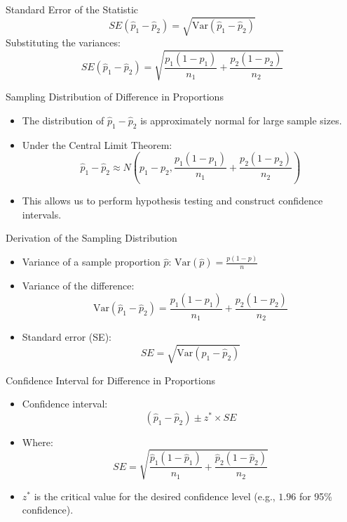 \documentclass[handout]{beamer} %
\begin{document}
\begin{frame}{Standard Error of the Statistic}
  \[
  SE(\hat{p}_1 - \hat{p}_2) = \sqrt{\text{Var}(\hat{p}_1 - \hat{p}_2)}
  \]
  Substituting the variances:
  \[
  SE(\hat{p}_1 - \hat{p}_2) = \sqrt{\frac{p_1(1 - p_1)}{n_1} + \frac{p_2(1 - p_2)}{n_2}}
  \]
\end{frame}

\begin{frame}{Sampling Distribution of Difference in Proportions}
  \begin{itemize}
    \item The distribution of $\hat{p}_1 - \hat{p}_2$ is approximately normal for large sample sizes.
    \item Under the Central Limit Theorem:
    \[
    \hat{p}_1 - \hat{p}_2 \approx N\left(p_1 - p_2, \frac{p_1(1 - p_1)}{n_1} + \frac{p_2(1 - p_2)}{n_2}\right)
    \]
    \item This allows us to perform hypothesis testing and construct confidence intervals.
  \end{itemize}
\end{frame}

\begin{frame}{Derivation of the Sampling Distribution}
  \begin{itemize}
    \item Variance of a sample proportion $\hat{p}$: $\text{Var}(\hat{p}) = \frac{p(1-p)}{n}$
    \item Variance of the difference:
    \[
    \text{Var}(\hat{p}_1 - \hat{p}_2) = \frac{p_1(1 - p_1)}{n_1} + \frac{p_2(1 - p_2)}{n_2}
    \]
    \item Standard error (SE):
    \[
    SE = \sqrt{\text{Var}(\hat{p}_1 - \hat{p}_2)}
    \]
  \end{itemize}
\end{frame}

\begin{frame}{Confidence Interval for Difference in Proportions}
  \begin{itemize}
    \item Confidence interval:
    \[
    (\hat{p}_1 - \hat{p}_2) \pm z^* \times SE
    \]
    \item Where:
    \[
    SE = \sqrt{\frac{\hat{p}_1(1-\hat{p}_1)}{n_1} + \frac{\hat{p}_2(1-\hat{p}_2)}{n_2}}
    \]
    \item $z^*$ is the critical value for the desired confidence level (e.g., $1.96$ for 95\% confidence).
  \end{itemize}
\end{frame}
\end{document}
